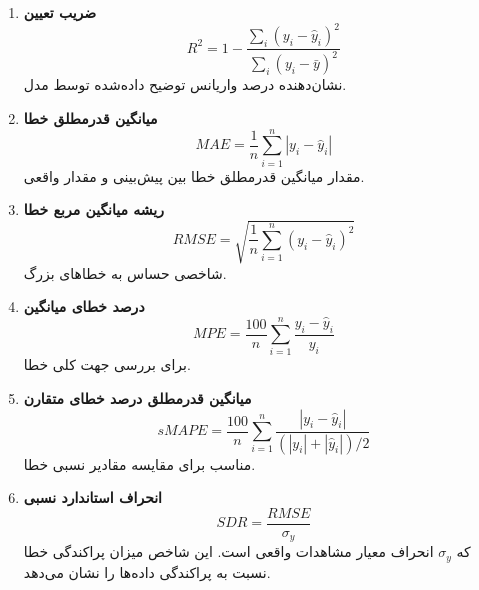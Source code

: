 \begin{enumerate}
	\item \textbf{ضریب تعیین}
\[
R^2 = 1 - \frac{\sum_{i}(y_i - \hat{y}_i)^2}{\sum_{i}(y_i - \bar{y})^2}
\]
نشان‌دهنده درصد واریانس توضیح داده‌شده توسط مدل.

	\item \textbf{میانگین قدرمطلق خطا}
\[
MAE = \frac{1}{n} \sum_{i=1}^{n} |y_i - \hat{y}_i|
\]
مقدار میانگین قدرمطلق خطا بین پیش‌بینی و مقدار واقعی.

	\item \textbf{ریشه میانگین مربع خطا}
\[
RMSE = \sqrt{ \frac{1}{n} \sum_{i=1}^{n} (y_i - \hat{y}_i)^2 }
\]
شاخصی حساس به خطاهای بزرگ.

	\item \textbf{درصد خطای میانگین}
\[
MPE = \frac{100}{n} \sum_{i=1}^{n} \frac{y_i - \hat{y}_i}{y_i}
\]
برای بررسی جهت کلی خطا.

	\item \textbf{میانگین قدرمطلق درصد خطای متقارن}
\[
sMAPE = \frac{100}{n} \sum_{i=1}^{n} \frac{|y_i - \hat{y}_i|}{(|y_i| + |\hat{y}_i|)/2}
\]
مناسب برای مقایسه مقادیر نسبی خطا.

	\item \textbf{انحراف استاندارد نسبی}
\[
SDR = \frac{RMSE}{\sigma_y}
\]
که \(\sigma_y\) انحراف معیار مشاهدات واقعی است. این شاخص میزان پراکندگی خطا نسبت به پراکندگی داده‌ها را نشان می‌دهد.
\end{enumerate}
